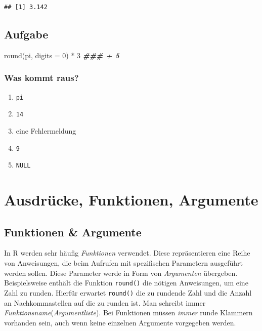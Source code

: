 \documentclass[
]{book}
\newenvironment{Shaded}{\begin{snugshade}}{\end{snugshade}}
\newcommand{\AttributeTok}[1]{\textcolor[rgb]{0.77,0.63,0.00}{#1}}
\newcommand{\DecValTok}[1]{\textcolor[rgb]{0.00,0.00,0.81}{#1}}
\newcommand{\DocumentationTok}[1]{\textcolor[rgb]{0.56,0.35,0.01}{\textbf{\textit{#1}}}}
\newcommand{\FunctionTok}[1]{\textcolor[rgb]{0.00,0.00,0.00}{#1}}
\newcommand{\NormalTok}[1]{#1}
\newcommand{\SpecialCharTok}[1]{\textcolor[rgb]{0.00,0.00,0.00}{#1}}
\providecommand{\tightlist}{%
  \setlength{\itemsep}{0pt}\setlength{\parskip}{0pt}}
\begin{document}
\begin{verbatim}
## [1] 3.142
\end{verbatim}

\hypertarget{aufgabe}{%
\subsection*{Aufgabe}\label{aufgabe}}

\begin{Shaded}
\begin{Highlighting}[]
\FunctionTok{round}\NormalTok{(pi, }\AttributeTok{digits =} \DecValTok{0}\NormalTok{) }\SpecialCharTok{*} \DecValTok{3} \DocumentationTok{\#\#\# + 5}
\end{Highlighting}
\end{Shaded}

\hypertarget{was-kommt-raus}{%
\subsubsection*{Was kommt raus?}\label{was-kommt-raus}}

\begin{enumerate}
\def\labelenumi{\Alph{enumi})}
\tightlist
\item
  \texttt{pi}
\item
  \texttt{14}
\item
  eine Fehlermeldung
\item
  \texttt{9}
\item
  \texttt{NULL}
\end{enumerate}

\hypertarget{ausdruxfccke-funktionen-argumente}{%
\section{Ausdrücke, Funktionen, Argumente}\label{ausdruxfccke-funktionen-argumente}}

\hypertarget{funktionen-argumente}{%
\subsection*{Funktionen \& Argumente}\label{funktionen-argumente}}

In R werden sehr häufig \emph{Funktionen} verwendet. Diese repräsentieren eine Reihe von Anweisungen, die beim Aufrufen mit spezifischen Parametern ausgeführt werden sollen. Diese Parameter werde in Form von \emph{Argumenten} übergeben.
Beispielsweise enthält die Funktion \texttt{round()} die nötigen Anweisungen, um eine Zahl zu runden. Hierfür erwartet \texttt{round()} die zu rundende Zahl und die Anzahl an Nachkommastellen auf die zu runden ist.
Man schreibt immer \emph{Funktionsname}(\emph{Argumentliste}). Bei Funktionen müssen \emph{immer} runde Klammern vorhanden sein, auch wenn keine einzelnen Argumente vorgegeben werden.
\end{document}
